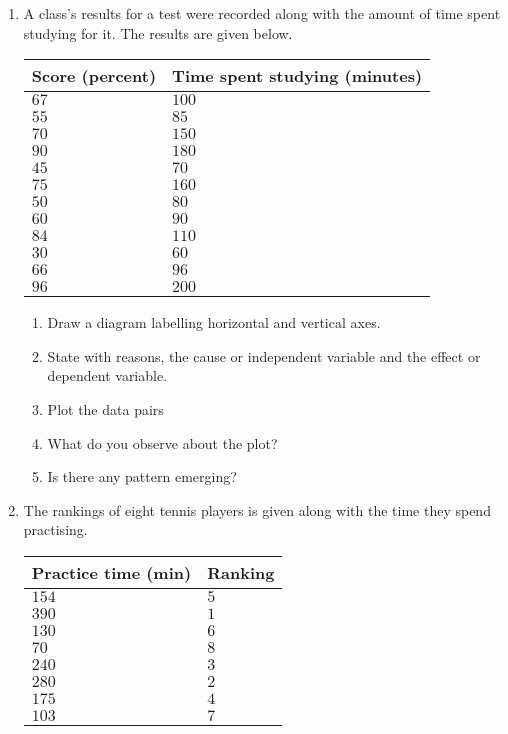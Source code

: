 {
\begin{enumerate}
\item A class's results for a test were recorded along with the amount of time spent studying for it. The results are given below.
\begin{center}
\begin{tabular}{|l|l|}
\hline
Score (percent) & Time spent studying (minutes)  \\ 
\hline
$67 $&$ 100 $ \\
$55 $& $85 $ \\
$70 $& $150 $ \\
$90 $& $180$  \\
$45 $& $70 $ \\
$75 $& $160 $ \\
$50 $& $80 $ \\
$60 $& $90$  \\
$84 $& $110 $ \\
$30$ & $60 $ \\
$66$ & $96 $ \\
$96$ & $200$  \\
\hline
\end{tabular}
\end{center}

	\begin{enumerate}
	\item Draw a diagram labelling horizontal and vertical axes. 
	\item State with reasons, the cause or independent variable and the effect or dependent variable.
	\item Plot the data pairs
	\item What do you observe about the plot?
	\item Is there any pattern emerging? 
	\end{enumerate}
\item The rankings of eight tennis players is given along with the time they spend practising.

\begin{center}
\begin{tabular}{|l|l|}
\hline
Practice time (min) & Ranking  \\ 
\hline
$154$ & $5$ \\
$390$ & $1$ \\
$130$ & $6$ \\
$70 $ & $8$ \\
$240$ & $3$ \\
$280$ & $2$ \\
$175$ & $4$ \\
$103$ & $7$ \\
\hline
\end{tabular}
\end{center}


\end{enumerate}}
